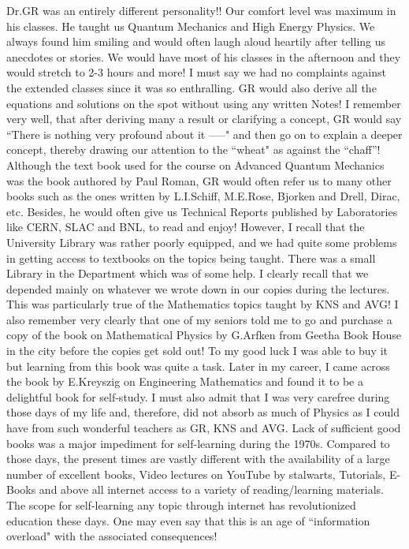 Dr.GR was an entirely different personality!! Our comfort level was maximum in his classes. He taught us Quantum Mechanics and High Energy Physics. We always found him smiling and would often laugh aloud heartily after telling us anecdotes or stories. We would have most of his classes in the afternoon and they would stretch to 2-3 hours and more! I must say we had no complaints against the extended classes since it was so enthralling. GR would also derive all the equations and solutions on the spot without using any written Notes! I remember very well, that after deriving many a result or clarifying a concept, GR would say ``There is nothing very profound about it -----" and then go on to explain a deeper concept, thereby drawing our attention to the ``wheat" as against the  ``chaff”! Although the text book used for the course on Advanced Quantum Mechanics was the book authored by Paul Roman, GR would often refer us to many other books such as the ones written by L.I.Schiff, M.E.Rose, Bjorken and Drell, Dirac, etc. Besides, he would often give us Technical Reports published by Laboratories like CERN, SLAC and BNL, to read and enjoy! However, I recall that the University Library was rather poorly equipped, and we had quite some problems in getting access to textbooks on the topics being taught. There was a small Library in the Department which was of some help. I clearly recall that we depended mainly on whatever we wrote down in our copies during the lectures. This was particularly true of the Mathematics topics taught by KNS and AVG! I also remember very clearly that one of my seniors told me to go and purchase a copy of the book on Mathematical Physics by G.Arfken from Geetha Book House in the city before the copies get sold out! To my good luck I was able to buy it but learning from this book was quite a task. Later in my career, I came across the book by E.Kreyszig on Engineering Mathematics and found it to be a delightful book for self-study. I must also admit that I was very carefree during those days of my life and, therefore, did not absorb as much of Physics as I could have from such wonderful teachers as GR, KNS and AVG. Lack of sufficient good books was a major impediment for self-learning during the 1970s. Compared to those days, the present times are vastly different with the availability of a large number of excellent books, Video lectures on YouTube by stalwarts, Tutorials, E-Books and above all internet access to a variety of reading/learning materials. The scope for self-learning any topic through internet has revolutionized education these days. One may even say that this is an age of  ``information overload" with the associated consequences!     

